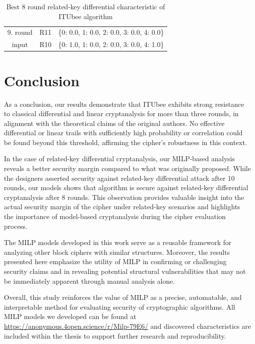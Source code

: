 \documentclass [version=final]{iacrcc}
\begin{document}
\begin{table}[ht]
\begin{tabular}{|c|c|c|}
        \hline
        9. round & R11 & \{0: 0.0, 1: 0.0, 2: 0.0, 3: 0.0, 4: 0.0\} \\
        input     & R10 & \{0: 1.0, 1: 0.0, 2: 0.0, 3: 0.0, 4: 1.0\} \\
        \hline
    \end{tabular}
    \caption{Best 8 round related-key differential characteristic of ITUbee algorithm}
    \label{tab:RelatedKeyDif}
\end{table}

\section{Conclusion}
As a conclusion, our results demonstrate that ITUbee exhibits strong resistance to classical differential and linear cryptanalysis for more than three rounds, in alignment with the theoretical claims of the original authors. No effective differential or linear trails with sufficiently high probability or correlation could be found beyond this threshold, affirming the cipher’s robustness in this context.

In the case of related-key differential cryptanalysis, our MILP-based analysis reveals a better security margin compared to what was originally proposed. While the designers asserted security against related-key differential attack after 10 rounds, our models shows that algorithm is secure against related-key differential cryptanalysis after 8 rounds. This observation provides valuable insight into the actual security margin of the cipher under related-key scenarios and highlights the importance of model-based cryptanalysis during the cipher evaluation process.

The MILP models developed in this work serve as a reusable framework for analyzing other block ciphers with similar structures. Moreover, the results presented here emphasize the utility of MILP in confirming or challenging security claims and in revealing potential structural vulnerabilities that may not be immediately apparent through manual analysis alone.

Overall, this study reinforces the value of MILP as a precise, automatable, and interpretable method for evaluating security of  cryptographic algorithms. All MILP models we developed can be found at \url{https://anonymous.4open.science/r/Milp-79E6/} and discovered characteristics are included within the thesis  to support further research and reproducibility.




\end{document}
